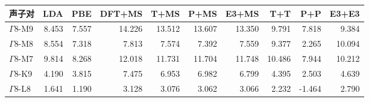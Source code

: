 \begin{tabular}{lrrrrrrrrr}
\toprule
声子对 & LDA & PBE & DFT+MS & T+MS & P+MS & E3+MS & T+T & P+P & E3+E3 \\
\midrule
$\Gamma$8-M9 & 8.453 & 7.557 & 14.226 & 13.512 & 13.607 & 13.350 & 9.791 & 7.818 & 9.384 \\
$\Gamma$8-M8 & 8.554 & 7.318 & 7.813 & 7.574 & 7.392 & 7.559 & 9.377 & 2.265 & 10.094 \\
$\Gamma$8-M7 & 9.814 & 8.268 & 12.018 & 11.731 & 11.704 & 11.748 & 10.486 & 7.944 & 10.212 \\
$\Gamma$8-K9 & 4.190 & 3.815 & 7.475 & 6.953 & 6.982 & 6.799 & 4.395 & 2.503 & 4.639 \\
$\Gamma$8-L8 & 1.641 & 1.190 & 3.128 & 3.076 & 3.062 & 3.066 & 2.232 & -1.464 & 2.790 \\
\bottomrule
\end{tabular}
